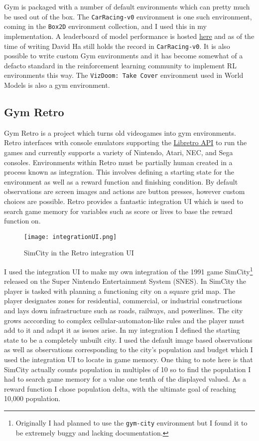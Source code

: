 \documentclass{article}
\numberwithin{figure}{section}
\theoremstyle{definition}
\begin{document}
Gym is packaged with a number of default environments which can pretty much be used out of the box.
The \texttt{CarRacing-v0} environment is one such environment, coming in the \texttt{Box2D} environment collection, and I used this in my implementation.
A leaderboard of model performance is hosted \href{https://github.com/openai/gym/wiki/Leaderboard}{here} and as of the time of writing David Ha still holds the record in \texttt{CarRacing-v0}.
It is also possible to write custom Gym environments and it has become somewhat of a defacto standard in the reinforcement learning community to implement RL environments this way.
The \texttt{VizDoom: Take Cover} environment used in World Models is also a gym environment.

\subsection{Gym Retro}

Gym Retro is a project which turns old videogames into gym environments. %
Retro interfaces with console emulators supporting the \href{https://www.libretro.com/index.php/api/}{Libretro API} to run the games and currently supports a variety of Nintendo, Atari, NEC, and Sega consoles.
Environments within Retro must be partially human created in a process known as integration.
This involves defining a starting state for the environment as well as a reward function and finishing condition.
By default observations are screen images and actions are button presses, however custom choices are possible.
Retro provides a fantastic integration UI which is used to search game memory for variables such as score or lives to base the reward function on.

\begin{figure}[h]
  \centering
  \texttt{[image: integrationUI.png]}
  \caption{SimCity in the Retro integration UI}
\end{figure}

I used the integration UI to make my own integration of the 1991 game SimCity\footnote{Originally I had planned to use the \texttt{gym-city} environment but I found it to be extremely buggy and lacking documentation.} released on the Super Nintendo Entertainment System (SNES).
In SimCity the player is tasked with planning a functioning city on a square grid map.
The player designates zones for residential, commercial, or industrial constructions and lays down infrastructure such as roads, railways, and powerlines.
The city grows acccording to complex cellular-automaton-like rules and the player must add to it and adapt it as issues arise.
In my integration I defined the starting state to be a completely unbuilt city.
I used the default image based observations as well as observations corresponding to the city's population and budget which I used the integration UI to locate in game memory.
One thing to note here is that SimCity actually counts population in multiples of 10 so to find the population I had to search game memory for a value one tenth of the displayed valued.
As a reward function I chose population delta, with the ultimate goal of reaching 10,000 population.
\end{document}
